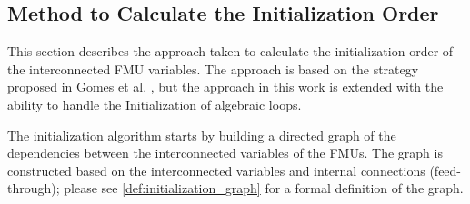 \subsection{Method to Calculate the Initialization Order}
This section describes the approach taken to calculate the initialization order of the interconnected FMU variables. The approach is based on the strategy proposed in Gomes et al. \cite{Gomes2020b, Broman2013}, but the approach in this work is extended with the ability to handle the Initialization of algebraic loops. 

The initialization algorithm starts by building a directed graph of the dependencies between the interconnected variables of the FMUs. The graph is constructed based on the interconnected variables and internal connections (feed-through); please see \cref{def:initialization_graph} for a formal definition of the graph. 



